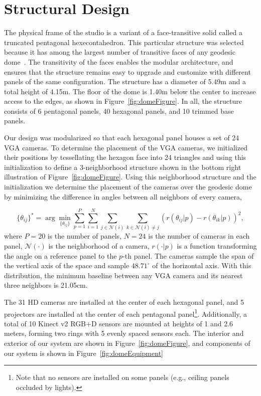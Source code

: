 \section{Structural Design}
	The physical frame of the studio is a variant of a face-transitive solid called a truncated pentagonal hexecontahedron. This particular structure was selected because it has among the largest number of transitive faces of any geodesic dome~\cite{Williams1979}. The transitivity of the faces enables the modular architecture, and ensures that the structure remains easy to upgrade and customize with different panels of the same configuration. The structure has a diameter of 5.49m and a total height of 4.15m. The floor of the dome is 1.40m below the center to increase access to the edges, as shown in Figure~\ref{fig:domeFigure}. In all, the structure consists of 6 pentagonal panels, 40 hexagonal panels, and 10 trimmed base panels. 
	
	Our design was modularized so that each hexagonal panel houses a set of 24 VGA cameras. To determine the placement of the VGA cameras, we initialized their positions by tessellating the hexagon face into 24 triangles and using this initialization to define a 3-neighborhood structure shown in the bottom right illustration of Figure~\ref{fig:domeFigure}. Using this neighborhood structure and the initialization we determine the placement of the cameras over the geodesic dome by minimizing the difference in angles between all neighbors of every camera,
	
	{\small
		\begin{equation}\nonumber
		\{\theta_{ij}\}^* = \arg \min_{\{\theta_{ij}\}} \sum_{p=1}^P \sum_{i=1}^{N} \sum_{j \in \mathcal{N}(i)}  \sum_{k \in \mathcal{N}(i) \neq j}  (r(\theta_{ij}|p)-r(\theta_{ik}|p))^2 ,
		\end{equation}
	}where $P=20$ is the number of panels, $N=24$ is the number of cameras in each panel, $\mathcal{N}(\cdot)$ is the neighborhood of a camera, $r(\cdot|p)$ is a function transforming the angle on a reference panel to the $p$-th panel. The cameras sample the span of the vertical axis of the space and sample $48.71^\circ$ of the horizontal axis. With this distribution, the minimum baseline between any VGA camera and its nearest three neighbors is 21.05cm. 
		
	The 31 HD cameras are installed at the center of each hexagonal panel, and 5 projectors are installed at the center of each pentagonal panel\footnote{Note that no sensors are installed on some panels (e.g., ceiling panels occluded by lights).}. Additionally, a total of 10 Kinect v2 RGB+D sensors are mounted at heights of 1 and 2.6 meters, forming two rings with 5 evenly spaced sensors each. The interior and exterior of our system are shown in Figure~\ref{fig:domeFigure}, and components of our system is shown in Figure~\ref{fig:domeEquipment}
	

